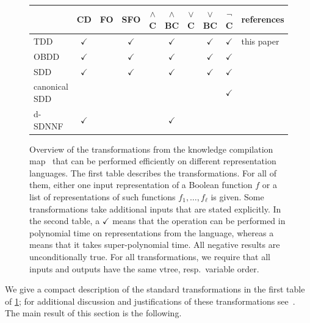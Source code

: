 \documentclass[a4paper,UKenglish,cleveref, autoref, thm-restate]{lipics-v2021}
\begin{document}
\begin{figure}[t]
\vspace{0.5cm}
\begin{tabular}{l|c|c|c|c|c|c|c|c|l}
			& CD           & FO          & SFO         & $\wedge$C    & $\wedge$BC   & $\vee$C     & $\vee$BC    & $\neg$C  & references     \\\hline
			TDD & $\checkmark$ & \textbullet  & $\checkmark$ & \textbullet & $\checkmark$ & \textbullet & $\checkmark$ & $\checkmark$ & this paper\\%
			OBDD  & $\checkmark$ & \textbullet  & $\checkmark$ & \textbullet & $\checkmark$ & \textbullet & $\checkmark$ & $\checkmark$ & \cite{DarwicheM2002} \\%
			SDD  & $\checkmark$ & \textbullet  & $\checkmark$ & \textbullet & $\checkmark$ & \textbullet & $\checkmark$ & $\checkmark$ & \cite{van2015role}\\%
			canonical SDD  & \textbullet & \textbullet  & \textbullet & \textbullet & \textbullet & \textbullet & \textbullet & $\checkmark$ & \cite{van2015role}\\%
			d-SDNNF  & $\checkmark$ & \textbullet & \textbullet & \textbullet  & $\checkmark$ & \textbullet & \textbullet & \textbullet & \cite{PipatsrisawatD08,Vinall-Smeeth24}\\%
		\end{tabular}
                \caption{Overview of the transformations from the knowledge compilation map~\cite{DarwicheM2002} that can be performed efficiently on different representation languages. The first table describes the transformations. For all of them, either one input representation of a Boolean function $f$ or a list of representations of such functions $f_1, \ldots, f_\ell$ is given. Some transformations take additional inputs that are stated explicitly. In the second table, a $\checkmark$ means that the operation can be performed in polynomial time on representations from the language, whereas a \textbullet{} means that it takes super-polynomial time. All negative results are unconditionally true. For all transformations, we require that all inputs and outputs have the same vtree, resp.~variable order.}
	\label{tab:transformations}
\end{figure}

We give a compact description of the standard transformations in the first table of \cref{tab:transformations}; for additional discussion and justifications of these transformations see~\cite{DarwicheM2002}. The main result of this section is the following.
\end{document}
